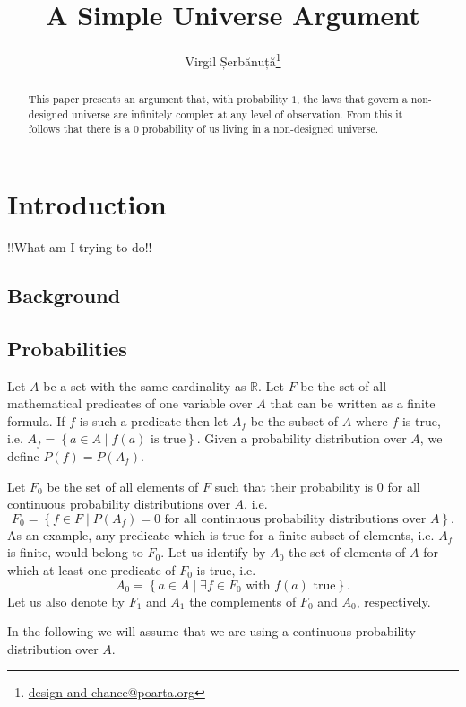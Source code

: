 \documentclass[a4paper
,draft
]{article}
\title{A Simple Universe Argument}
\author{Virgil Șerbănuță\thanks{\href{mailto:design-and-chance@poarta.org}{design-and-chance@poarta.org}}}
\newcommand{\svn}[2][]{\todo[author=Virgil,color=red!25!white,#1]{#2}}
\def\reale{\mathbb{R}}
\newcommand{\paper}[1]{paper}
\newcommand{\multime}[1]{\left\{ #1 \right\}}
\begin{document}
\maketitle

\begin{abstract}
  This \paper{} presents an argument that, with probability $1$, the laws
  that govern a non-designed universe are infinitely complex at any level
  of observation. From this it follows that there is a $0$ probability
  of us living in a non-designed universe.
\end{abstract}

\section{Introduction}

!!What am I trying to do!!

\subsection{Background}
\subsection{Probabilities}

Let $A$ be a set with the same cardinality as $\reale$. Let $F$ be the set of
all mathematical predicates of one variable over $A$ that can be written as a
finite formula. If $f$ is such a predicate then let $A_f$ be the subset of
$A$ where $f$ is true, i.e. $A_f=\multime{a\in A\mid f(a) \mbox{ is true}}$.
Given a probability distribution over $A$, we define $P(f)=P(A_f)$.

Let $F_0$ be the set of all elements of $F$ such that their probability is
$0$ for all continuous probability distributions over $A$, i.e.
$$F_0=\multime{
  f\in F
  \mid P(A_f)=0
    \mbox{ for all continuous probability distributions over } A}.
$$
As an example, any predicate which is true for a finite subset of elements,
i.e. $A_f$ is finite, would belong to $F_0$. Let us identify by $A_0$ the
set of elements of $A$ for which at least one predicate of $F_0$ is true, i.e.
$$A_0=\multime{a \in A\mid \exists f\in F_0 \mbox{ with } f(a)\mbox{ true} }.$$
Let us also denote by $F_1$ and $A_1$ the complements of $F_0$ and $A_0$,
respectively.

In the following we will assume that we are using a continuous probability
distribution over $A$.
\svn{Do I need this?}
\end{document}
